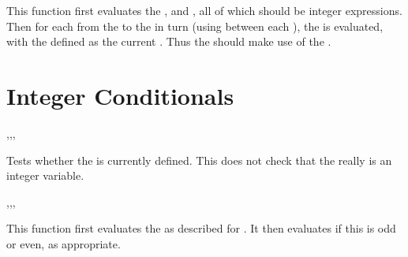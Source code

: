 \documentclass[oneside]{book}
\begin{document}
\begin{function}{\IntStepVariable}
\begin{syntax}
     
\end{syntax}
This function first evaluates the , 
and , all of which should be integer expressions.
Then for each  from the  to the
 in turn (using  between each
), the  is evaluated,
with the  defined as the current . Thus
the  should make use of the .
\end{function}

\section{Integer Conditionals}

\begin{function}{\IntIfExist,\IntIfExistT,\IntIfExistF,\IntIfExistTF}
\begin{syntax}
 
  
  
   
\end{syntax}
Tests whether the  is currently defined.  This does not
check that the  really is an integer variable.
\end{function}

\begin{function}{\IntIfOdd,\IntIfOddT,\IntIfOddF,\IntIfOddTF}
\begin{syntax}
 
  
  
   
\end{syntax}
This function first evaluates the 
as described for .
It then evaluates if this is odd or even, as appropriate.
\end{function}
\end{document}
